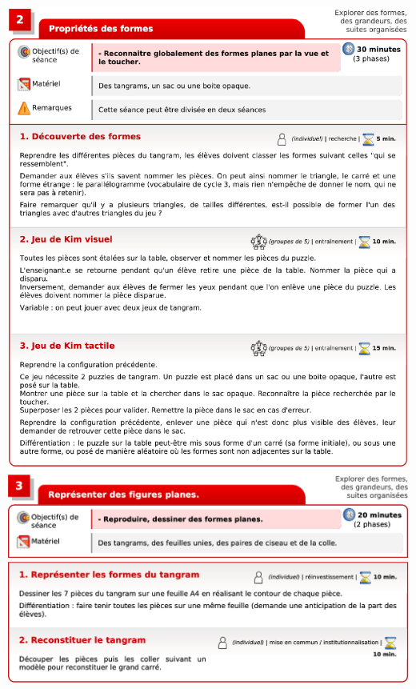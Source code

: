 \begin{exercice*}
\begin{center}
   \includegraphics[width=15cm]{Geometrie_did/Images/Geo5_activite_edumoov4} \\ [10mm]
   \includegraphics[width=15cm]{Geometrie_did/Images/Geo5_activite_edumoov5} \\
   \includegraphics[width=15cm]{Geometrie_did/Images/Geo5_activite_edumoov6} \\

\end{center}
\end{exercice*}
